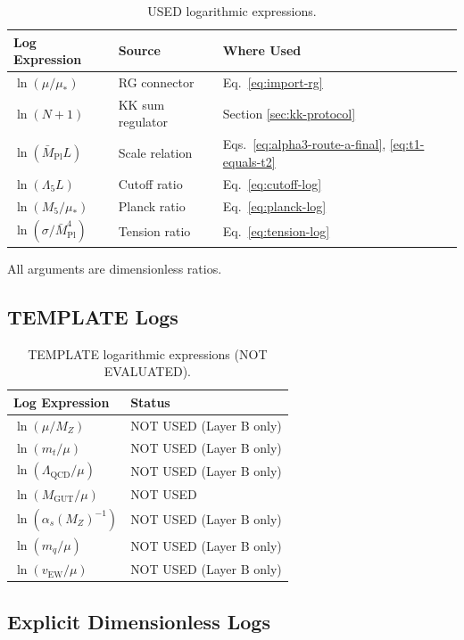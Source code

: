 \documentclass[11pt,a4paper]{article}
\theoremstyle{definition}
\begin{document}
\begin{table}[ht]
\centering
\caption{USED logarithmic expressions.}
\label{tab:used-logs}
\begin{tabular}{lll}
\toprule
Log Expression & Source & Where Used \\
\midrule
$\ln(\mu/\mu_*)$ & RG connector & Eq.~\eqref{eq:import-rg} \\
$\ln(N+1)$ & KK sum regulator & Section \ref{sec:kk-protocol} \\
$\ln(\bar{M}_{\text{Pl}} L)$ & Scale relation & Eqs.~\eqref{eq:alpha3-route-a-final}, \eqref{eq:t1-equals-t2} \\
$\ln(\Lambda_5 L)$ & Cutoff ratio & Eq.~\eqref{eq:cutoff-log} \\
$\ln(M_5/\mu_*)$ & Planck ratio & Eq.~\eqref{eq:planck-log} \\
$\ln(\sigma/\bar{M}_{\text{Pl}}^4)$ & Tension ratio & Eq.~\eqref{eq:tension-log} \\
\bottomrule
\end{tabular}
\end{table}

All arguments are dimensionless ratios.

\subsection{TEMPLATE Logs}
\label{subsec:template-logs}

\begin{table}[ht]
\centering
\caption{TEMPLATE logarithmic expressions (NOT EVALUATED).}
\label{tab:template-logs}
\begin{tabular}{ll}
\toprule
Log Expression & Status \\
\midrule
$\ln(\mu/M_Z)$ & NOT USED (Layer B only) \\
$\ln(m_t/\mu)$ & NOT USED (Layer B only) \\
$\ln(\Lambda_{\text{QCD}}/\mu)$ & NOT USED (Layer B only) \\
$\ln(M_{\text{GUT}}/\mu)$ & NOT USED \\
$\ln(\alpha_s(M_Z)^{-1})$ & NOT USED (Layer B only) \\
$\ln(m_q/\mu)$ & NOT USED (Layer B only) \\
$\ln(v_{\text{EW}}/\mu)$ & NOT USED (Layer B only) \\
\bottomrule
\end{tabular}
\end{table}

\subsection{Explicit Dimensionless Logs}
\label{subsec:explicit-logs}
\end{document}
